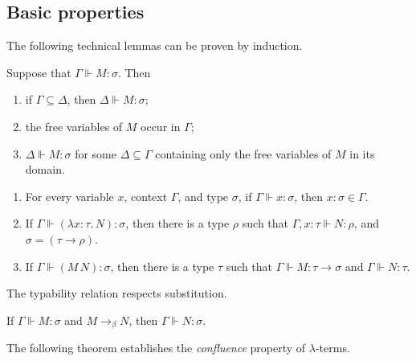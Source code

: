\subsection{Basic properties}
The following technical lemmas can be proven by induction.
\begin{lemma}
    Suppose that \( \Gamma \Vdash M : \sigma \).
    Then
    \begin{enumerate}
        \item if \( \Gamma \subseteq \Delta \), then \( \Delta \Vdash M : \sigma \);
        \item the free variables of \( M \) occur in \( \Gamma \);
        \item \( \Delta \Vdash M : \sigma \) for some \( \Delta \subseteq \Gamma \) containing only the free variables of \( M \) in its domain.
    \end{enumerate}
\end{lemma}
\begin{lemma}
    \begin{enumerate}
        \item For every variable \( x \), context \( \Gamma \), and type \( \sigma \), if \( \Gamma \Vdash x : \sigma \), then \( x : \sigma \in \Gamma \).
        \item If \( \Gamma \Vdash (\lambda x: \tau.\, N) : \sigma \), then there is a type \( \rho \) such that \( \Gamma, x : \tau \Vdash N : \rho \), and \( \sigma = (\tau \to \rho) \).
        \item If \( \Gamma \Vdash (M\, N) : \sigma \), then there is a type \( \tau \) such that \( \Gamma \Vdash M : \tau \to \sigma \) and \( \Gamma \Vdash N : \tau \).
    \end{enumerate}
\end{lemma}
\begin{lemma}
    The typability relation respects substitution.
\end{lemma}
\begin{lemma}
    If \( \Gamma \Vdash M : \sigma \) and \( M \to_\beta N \), then \( \Gamma \Vdash N : \sigma \).
\end{lemma}
The following theorem establishes the \emph{confluence} property of \( \lambda \)-terms.
